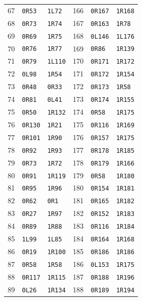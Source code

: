 \begin{longtable}{@{}r ll @{\qquad} r ll@{}}
67 & \texttt{0R53} & \texttt{1L72} & 166 & \texttt{0R167} & \texttt{1R168} \\
68 & \texttt{0R73} & \texttt{1R74} & 167 & \texttt{0R163} & \texttt{1R78} \\
69 & \texttt{0R69} & \texttt{1R75} & 168 & \texttt{0L146} & \texttt{1L176} \\
70 & \texttt{0R76} & \texttt{1R77} & 169 & \texttt{0R86} & \texttt{1R139} \\
71 & \texttt{0R79} & \texttt{1L110} & 170 & \texttt{0R171} & \texttt{1R172} \\
72 & \texttt{0L98} & \texttt{1R54} & 171 & \texttt{0R172} & \texttt{1R154} \\
73 & \texttt{0R48} & \texttt{0R33} & 172 & \texttt{0R173} & \texttt{1R58} \\
74 & \texttt{0R81} & \texttt{0L41} & 173 & \texttt{0R174} & \texttt{1R155} \\
75 & \texttt{0R50} & \texttt{1R132} & 174 & \texttt{0R58} & \texttt{1R175} \\
76 & \texttt{0R130} & \texttt{1R21} & 175 & \texttt{0R116} & \texttt{1R169} \\
77 & \texttt{0R101} & \texttt{1R90} & 176 & \texttt{0R157} & \texttt{1R175} \\
78 & \texttt{0R92} & \texttt{1R93} & 177 & \texttt{0R178} & \texttt{1R185} \\
79 & \texttt{0R73} & \texttt{1R72} & 178 & \texttt{0R179} & \texttt{1R166} \\
80 & \texttt{0R91} & \texttt{1R119} & 179 & \texttt{0R58} & \texttt{1R180} \\
81 & \texttt{0R95} & \texttt{1R96} & 180 & \texttt{0R154} & \texttt{1R181} \\
82 & \texttt{0R62} & \texttt{0R1} & 181 & \texttt{0R165} & \texttt{1R182} \\
83 & \texttt{0R27} & \texttt{1R97} & 182 & \texttt{0R152} & \texttt{1R183} \\
84 & \texttt{0R89} & \texttt{1R88} & 183 & \texttt{0R116} & \texttt{1R184} \\
85 & \texttt{1L99} & \texttt{1L85} & 184 & \texttt{0R164} & \texttt{1R168} \\
86 & \texttt{0R19} & \texttt{1R100} & 185 & \texttt{0R186} & \texttt{1R186} \\
87 & \texttt{0R58} & \texttt{1R58} & 186 & \texttt{0L153} & \texttt{1R175} \\
88 & \texttt{0R117} & \texttt{1R115} & 187 & \texttt{0R188} & \texttt{1R196} \\
89 & \texttt{0L26} & \texttt{1R134} & 188 & \texttt{0R189} & \texttt{1R194} \\

\end{longtable}
